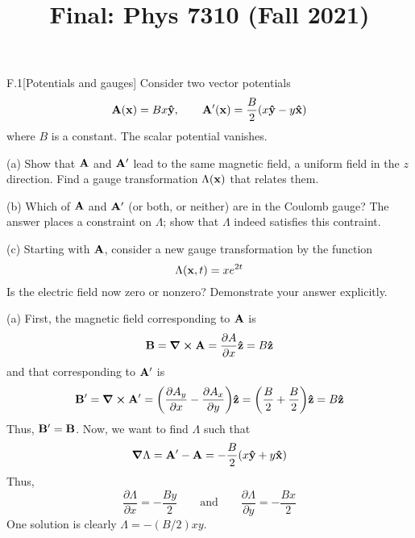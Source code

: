 \documentclass[12pt]{article}
\title{Final: Phys 7310 (Fall 2021)}
\begin{document}
\maketitle
\begin{problem}{F.1}[Potentials and gauges]
Consider two vector potentials
\begin{equation}
    \vb{A}(\vb{x})=Bx\vb{\hat{y}},\qquad \vb{A}'(\vb{x})=\frac{B}2\qty(x\vb{\hat{y}}-y\vb{\hat{x}})
\end{equation}
where $B$ is a constant. The scalar potential vanishes.

(a) Show that $\vb{A}$ and $\vb{A}'$ lead to the same magnetic field, a uniform
field in the $z$ direction. Find a gauge transformation $\Lambda(\vb{x})$ that
relates them.

(b) Which of $\vb{A}$ and $\vb{A}'$ (or both, or neither) are in the Coulomb
gauge? The answer places a constraint on $\Lambda$; show that $\Lambda$ indeed
satisfies this contraint.

(c) Starting with $\vb{A}$, consider a new gauge transformation by the function
\begin{equation}
    \Lambda(\vb{x},t)=xe^{2t} 
\end{equation}
Is the electric field now zero or nonzero? Demonstrate your answer explicitly.
\begin{solution}
(a) First, the magnetic field corresponding to $\vb{A}$ is
\begin{equation}
    \vb{B}=\curl{\vb{A}}=\frac{\partial A}{\partial x}\vb{\hat{z}}=B\vb{\hat{z}} 
\end{equation}
and that corresponding to $\vb{A}'$ is
\begin{equation}
    \vb{B}'=\curl{\vb{A}'}=\qty(\frac{\partial A_y}{\partial x}-\frac{\partial
    A_x}{\partial y})\vb{\hat{z}}=\qty(\frac{B}2+\frac{B}2)\vb{\hat{z}}=B\vb{\hat{z}}
\end{equation}
Thus, $\vb{B}'=\vb{B}$. Now, we want to find $\Lambda$ such that
\begin{equation}
    \grad\Lambda=\vb{A}'-\vb{A}=-\frac{B}2\qty(x\vb{\hat{y}}+y\vb{\hat{x}})
\end{equation}
Thus,
\begin{equation}
    \frac{\partial\Lambda}{\partial x}=-\frac{By}{2}\qquad\text{and}\qquad
    \frac{\partial\Lambda}{\partial y}=-\frac{Bx}{2}
\end{equation}
One solution is clearly $\Lambda=-(B/2)xy$.


\end{solution}
\end{problem}
\end{document}
